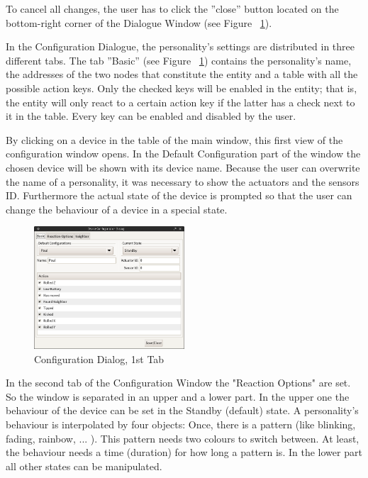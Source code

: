 To cancel all changes, the user has to click the ''close'' button located on the bottom-right corner of the Dialogue Window (see Figure ~\ref{fig:java-server-config01}).   

In the Configuration Dialogue, the personality's settings are distributed in three different tabs. The tab ''Basic'' (see Figure ~\ref{fig:java-server-config01}) contains the personality's name, the addresses of the two nodes that constitute the entity and a table with all the possible action keys. Only the checked keys will be enabled in the entity; that is, the entity will only react to a certain action key if the latter has a check next to it in the table. Every key can be enabled and disabled by the user. 

By clicking on a device in the table of the main window, this first view of the configuration window opens. In the Default Configuration part of the window the chosen device will be shown with its device name. Because the user can overwrite the name of a personality, it was necessary to show the actuators and the sensors ID.
Furthermore the actual state of the device is prompted so that the user can change the behaviour of a device in a special state. 


\begin{figure}[h!]
 \centering
 \includegraphics[width= 0.5\textwidth, clip=true  ,keepaspectratio=true]{./pic/java-server-config01.png}
 \caption{Configuration Dialog, 1st Tab}
 \label{fig:java-server-config01}
\end{figure}

In the second tab of the Configuration Window the "Reaction Options" are set.
So the window is separated in an upper and a lower part. In the upper one the behaviour of the device can be set in the Standby (default) state. A personality's behaviour is interpolated by four objects: Once, there is a pattern (like blinking, fading, rainbow, ... ). This pattern needs two colours to switch between. At least, the behaviour needs a time (duration) for how long a pattern is.
In the lower part all other states can be manipulated.   


